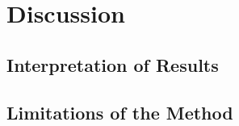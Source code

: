 
\chapter{Discussion}\label{chapter:discussion}

\section{Interpretation of Results}

\section{Limitations of the Method}